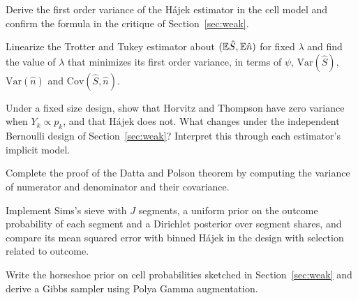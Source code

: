 \begin{exercises}
\item\label{ex:chweak:1} Derive the first order variance of the H\'ajek estimator in the cell model and confirm the formula in the critique of Section~\ref{sec:weak}.
\item\label{ex:chweak:2} Linearize the Trotter and Tukey estimator about $(\mathbb{E}\hat S, \mathbb{E}\hat n)$ for fixed $\lambda$ and find the value of $\lambda$ that minimizes its first order variance, in terms of $\psi$, $\mathrm{Var}(\hat S)$, $\mathrm{Var}(\hat n)$ and $\mathrm{Cov}(\hat S, \hat n)$.
\item\label{ex:chweak:3} Under a fixed size design, show that Horvitz and Thompson have zero variance when $Y_k \propto p_k$, and that H\'ajek does not. What changes under the independent Bernoulli design of Section~\ref{sec:weak}? Interpret this through each estimator's implicit model.
\item\label{ex:chweak:4} Complete the proof of the Datta and Polson theorem by computing the variance of numerator and denominator and their covariance.
\item\label{ex:chweak:5} Implement Sims's sieve with $J$ segments, a uniform prior on the outcome probability of each segment and a Dirichlet posterior over segment shares, and compare its mean squared error with binned H\'ajek in the design with selection related to outcome.
\item\label{ex:chweak:6} Write the horseshoe prior on cell probabilities sketched in Section~\ref{sec:weak} and derive a Gibbs sampler using Polya Gamma augmentation.
\end{exercises}
